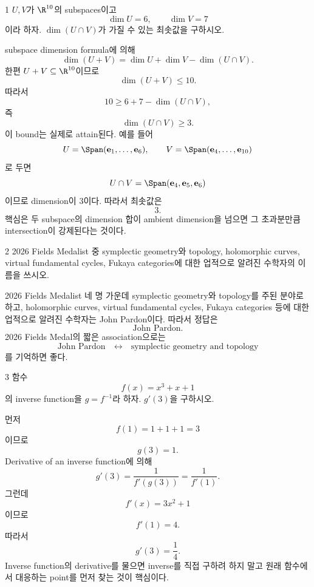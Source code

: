 
\begin{problem}{1}
$U,V$가 $\R^{10}$의 subspaces이고
\[
    \dim U=6,
    \qquad
    \dim V=7
\]
이라 하자. $\dim(U\cap V)$가 가질 수 있는 최솟값을 구하시오.
\end{problem}

\begin{solution}
subspace dimension formula에 의해
\[
    \dim(U+V)
    =\dim U+\dim V-\dim(U\cap V).
\]
한편 $U+V\subseteq\R^{10}$이므로
\[
    \dim(U+V)\leq10.
\]
따라서
\[
    10
    \geq6+7-\dim(U\cap V),
\]
즉
\[
    \dim(U\cap V)\geq3.
\]
이 bound는 실제로 attain된다. 예를 들어
\[
    U=\Span(\mathbf e_1,\ldots,\mathbf e_6),
    \qquad
    V=\Span(\mathbf e_4,\ldots,\mathbf e_{10})
\]
로 두면
\[
    U\cap V=\Span(\mathbf e_4,\mathbf e_5,\mathbf e_6)
\]
이므로 dimension이 $3$이다. 따라서 최솟값은
\[
    \boxed{3}.
\]
핵심은 두 subspace의 dimension 합이 ambient dimension을 넘으면 그 초과분만큼 intersection이 강제된다는 것이다.
\end{solution}

\begin{problem}{2}
2026 Fields Medalist 중 symplectic geometry와 topology, holomorphic curves, virtual fundamental cycles, Fukaya categories에 대한 업적으로 알려진 수학자의 이름을 쓰시오.
\end{problem}

\begin{solution}
2026 Fields Medalist 네 명 가운데 symplectic geometry와 topology를 주된 분야로 하고, holomorphic curves, virtual fundamental cycles, Fukaya categories 등에 대한 업적으로 알려진 수학자는 John Pardon이다. 따라서 정답은
\[
    \boxed{\text{John Pardon}}.
\]
2026 Fields Medal의 짧은 association으로는
\[
    \text{John Pardon}
    \quad\longleftrightarrow\quad
    \text{symplectic geometry and topology}
\]
를 기억하면 좋다.
\end{solution}

\begin{problem}{3}
함수
\[
    f(x)=x^3+x+1
\]
의 inverse function을 $g=f^{-1}$라 하자. $g'(3)$을 구하시오.
\end{problem}

\begin{solution}
먼저
\[
    f(1)=1+1+1=3
\]
이므로
\[
    g(3)=1.
\]
Derivative of an inverse function에 의해
\[
    g'(3)
    =\frac{1}{f'(g(3))}
    =\frac{1}{f'(1)}.
\]
그런데
\[
    f'(x)=3x^2+1
\]
이므로
\[
    f'(1)=4.
\]
따라서
\[
    \boxed{g'(3)=\frac14}.
\]
Inverse function의 derivative를 물으면 inverse를 직접 구하려 하지 말고 원래 함수에서 대응하는 point를 먼저 찾는 것이 핵심이다.
\end{solution}

